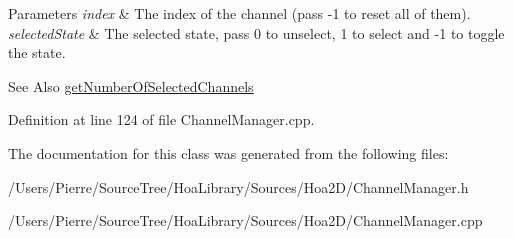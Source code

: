 \begin{DoxyParams}{Parameters}
{\em index} & The index of the channel (pass -\/1 to reset all of them). \\
\hline
{\em selected\-State} & The selected state, pass 0 to unselect, 1 to select and -\/1 to toggle the state. \\
\hline
\end{DoxyParams}
\begin{DoxySeeAlso}{See Also}
\hyperlink{class_hoa2_d_1_1_channel_manager_a0f33fda180a50a3b2a144d62801b0f56}{get\-Number\-Of\-Selected\-Channels} 
\end{DoxySeeAlso}


Definition at line 124 of file Channel\-Manager.\-cpp.



The documentation for this class was generated from the following files\-:\begin{DoxyCompactItemize}
\item 
/\-Users/\-Pierre/\-Source\-Tree/\-Hoa\-Library/\-Sources/\-Hoa2\-D/Channel\-Manager.\-h\item 
/\-Users/\-Pierre/\-Source\-Tree/\-Hoa\-Library/\-Sources/\-Hoa2\-D/Channel\-Manager.\-cpp\end{DoxyCompactItemize}
